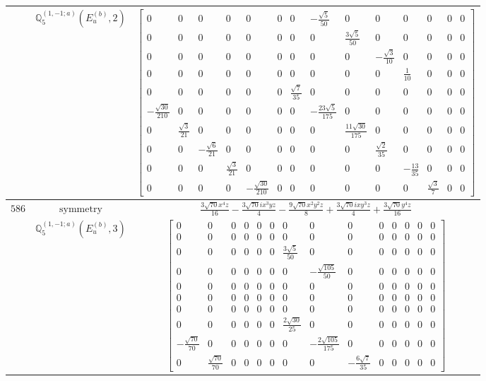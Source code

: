 \documentclass[fleqn,8pt,landscape]{jsarticle}
\begin{document}
\begin{longtable}{ccc}
$  $ & $ \mathbb{Q}_{5}^{(1,-1;a)}(E_{u}^{(b)},2) $ & $ \begin{bmatrix} 0 & 0 & 0 & 0 & 0 & 0 & 0 & - \frac{\sqrt{5}}{50} & 0 & 0 & 0 & 0 & 0 & 0 \\ 0 & 0 & 0 & 0 & 0 & 0 & 0 & 0 & \frac{3 \sqrt{5}}{50} & 0 & 0 & 0 & 0 & 0 \\ 0 & 0 & 0 & 0 & 0 & 0 & 0 & 0 & 0 & - \frac{\sqrt{3}}{10} & 0 & 0 & 0 & 0 \\ 0 & 0 & 0 & 0 & 0 & 0 & 0 & 0 & 0 & 0 & \frac{1}{10} & 0 & 0 & 0 \\ 0 & 0 & 0 & 0 & 0 & 0 & \frac{\sqrt{7}}{35} & 0 & 0 & 0 & 0 & 0 & 0 & 0 \\ - \frac{\sqrt{30}}{210} & 0 & 0 & 0 & 0 & 0 & 0 & - \frac{23 \sqrt{5}}{175} & 0 & 0 & 0 & 0 & 0 & 0 \\ 0 & \frac{\sqrt{3}}{21} & 0 & 0 & 0 & 0 & 0 & 0 & \frac{11 \sqrt{30}}{175} & 0 & 0 & 0 & 0 & 0 \\ 0 & 0 & - \frac{\sqrt{6}}{21} & 0 & 0 & 0 & 0 & 0 & 0 & \frac{\sqrt{2}}{35} & 0 & 0 & 0 & 0 \\ 0 & 0 & 0 & \frac{\sqrt{3}}{21} & 0 & 0 & 0 & 0 & 0 & 0 & - \frac{13}{35} & 0 & 0 & 0 \\ 0 & 0 & 0 & 0 & - \frac{\sqrt{30}}{210} & 0 & 0 & 0 & 0 & 0 & 0 & \frac{\sqrt{3}}{7} & 0 & 0 \end{bmatrix} $ \\ \hline
$ 586 $ & $ \text{symmetry} $ & $ \frac{3 \sqrt{70} x^{4} z}{16} - \frac{3 \sqrt{70} i x^{3} y z}{4} - \frac{9 \sqrt{70} x^{2} y^{2} z}{8} + \frac{3 \sqrt{70} i x y^{3} z}{4} + \frac{3 \sqrt{70} y^{4} z}{16} $ \\
$  $ & $ \mathbb{Q}_{5}^{(1,-1;a)}(E_{u}^{(b)},3) $ & $ \begin{bmatrix} 0 & 0 & 0 & 0 & 0 & 0 & 0 & 0 & 0 & 0 & 0 & 0 & 0 & 0 \\ 0 & 0 & 0 & 0 & 0 & 0 & 0 & 0 & 0 & 0 & 0 & 0 & 0 & 0 \\ 0 & 0 & 0 & 0 & 0 & 0 & \frac{3 \sqrt{5}}{50} & 0 & 0 & 0 & 0 & 0 & 0 & 0 \\ 0 & 0 & 0 & 0 & 0 & 0 & 0 & - \frac{\sqrt{105}}{50} & 0 & 0 & 0 & 0 & 0 & 0 \\ 0 & 0 & 0 & 0 & 0 & 0 & 0 & 0 & 0 & 0 & 0 & 0 & 0 & 0 \\ 0 & 0 & 0 & 0 & 0 & 0 & 0 & 0 & 0 & 0 & 0 & 0 & 0 & 0 \\ 0 & 0 & 0 & 0 & 0 & 0 & 0 & 0 & 0 & 0 & 0 & 0 & 0 & 0 \\ 0 & 0 & 0 & 0 & 0 & 0 & \frac{2 \sqrt{30}}{25} & 0 & 0 & 0 & 0 & 0 & 0 & 0 \\ - \frac{\sqrt{70}}{70} & 0 & 0 & 0 & 0 & 0 & 0 & - \frac{2 \sqrt{105}}{175} & 0 & 0 & 0 & 0 & 0 & 0 \\ 0 & \frac{\sqrt{70}}{70} & 0 & 0 & 0 & 0 & 0 & 0 & - \frac{6 \sqrt{7}}{35} & 0 & 0 & 0 & 0 & 0 \end{bmatrix} $ \\ \hline

\end{longtable}
\end{document}
